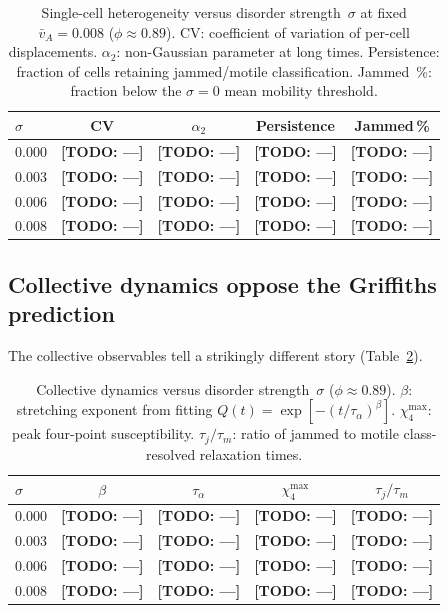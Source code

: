 \documentclass[aps,pre,twocolumn,superscriptaddress,longbibliography,floatfix]{revtex4-2}
\newcommand{\TODO}[1]{{\color{red}\textbf{[TODO: #1]}}}
\begin{document}
\begin{table}[b]
\caption{Single-cell heterogeneity versus disorder strength~$\sigma$ at
  fixed $\bar{v}_A\!=\!0.008$ ($\phi\!\approx\!0.89$).  CV: coefficient of variation of
  per-cell displacements.  $\alpha_2$: non-Gaussian parameter at
  long times.  Persistence: fraction of cells retaining jammed/motile
  classification.  Jammed~\%: fraction below the $\sigma\!=\!0$ mean
  mobility threshold.}
\label{tab:single-cell}
\begin{ruledtabular}
\begin{tabular}{lcccc}
$\sigma$ & CV & $\alpha_2$ & Persistence & Jammed\,\% \\
\midrule
0.000 & \TODO{---} & \TODO{---} & \TODO{---} & \TODO{---} \\
0.003 & \TODO{---} & \TODO{---} & \TODO{---} & \TODO{---} \\
0.006 & \TODO{---} & \TODO{---} & \TODO{---} & \TODO{---} \\
0.008 & \TODO{---} & \TODO{---} & \TODO{---} & \TODO{---} \\
\end{tabular}
\end{ruledtabular}
\end{table}

\subsection{Collective dynamics oppose the Griffiths prediction}
\label{sec:collective}

The collective observables tell a strikingly different story
(Table~\ref{tab:collective}).

\begin{table}[b]
\caption{Collective dynamics versus disorder strength~$\sigma$
  ($\phi\!\approx\!0.89$).
  $\beta$: stretching exponent from fitting
  $Q(t)=\exp[-(t/\tau_\alpha)^\beta]$.
  $\chi_4^{\max}$: peak four-point susceptibility.
  $\tau_j/\tau_m$: ratio of jammed to motile class-resolved relaxation
  times.}
\label{tab:collective}
\begin{ruledtabular}
\begin{tabular}{lcccc}
$\sigma$ & $\beta$ & $\tau_\alpha$ & $\chi_4^{\max}$
  & $\tau_j/\tau_m$ \\
\midrule
0.000 & \TODO{---} & \TODO{---} & \TODO{---} & \TODO{---} \\
0.003 & \TODO{---} & \TODO{---} & \TODO{---} & \TODO{---} \\
0.006 & \TODO{---} & \TODO{---} & \TODO{---} & \TODO{---} \\
0.008 & \TODO{---} & \TODO{---} & \TODO{---} & \TODO{---} \\
\end{tabular}
\end{ruledtabular}
\end{table}
\end{document}
